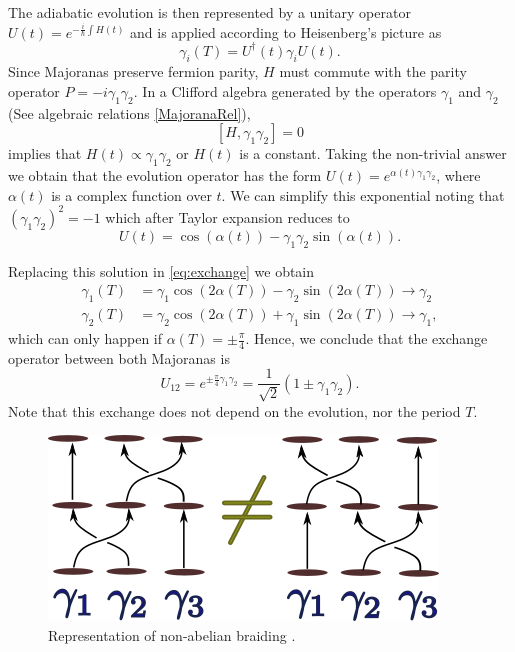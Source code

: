 The adiabatic evolution is then represented by a unitary operator  $ U(t) = e^{-\frac{i}{\hbar}\int H(t)} $ and is applied according to Heisenberg's picture as 
$$\gamma_i(T) = U^\dagger(t)\gamma_iU(t).$$
 \noindent Since Majoranas preserve fermion parity,  $H$ must commute with the parity operator  $P = -i\gamma_{1}\gamma_{2} $. In a Clifford algebra generated by the operators $\gamma_1$ and $\gamma_2$ (See algebraic relations \eqref{MajoranaRel}), $$[H,\gamma_{1}\gamma_{2}]=0$$ implies that $H(t) \propto \gamma_{1}\gamma_{2}$ or $H(t)$ is a constant. Taking the non-trivial answer we obtain that the  evolution operator has the form $  U(t) = e^{\alpha(t) \gamma_1\gamma_2}$, where $\alpha(t)$ is a complex function over $t$. We can simplify this exponential noting that $\left( \gamma_1\gamma_2 \right)^2 =-1$ which after Taylor expansion reduces to
 \begin{equation}
  U(t) = \cos(\alpha(t))-\gamma_1\gamma_2\sin(\alpha(t)).
 \end{equation}

Replacing this solution in \eqref{eq:exchange} we obtain 
\begin{equation}
\begin{aligned}
\gamma_1(T) &= \gamma_1 \cos(2\alpha(T))- \gamma_2 \sin(2\alpha(T)) \rightarrow  \gamma_2\\
\gamma_2(T) &= \gamma_2 \cos(2\alpha(T))+ \gamma_1 \sin(2\alpha(T)) \rightarrow  \gamma_1,
\end{aligned}
\label{eq:nonab}
\end{equation}
which can only happen if $\alpha(T) = \pm\frac{\pi}{4}$. Hence, we conclude that the exchange operator between both Majoranas is 
\begin{equation}
U_{12} = e^{\pm\frac{\pi}{4} \gamma_1\gamma_2}=\frac{1}{\sqrt{2}}\left( 1 \pm \gamma_1 \gamma_2 \right).
\end{equation}
Note that this exchange does not depend on the  evolution, nor  the period $T$. 

\begin{figure}
  \centering
  \includegraphics[scale=1]{IMAGES/Majorana/nonAb.png}
  \caption{\label{fig:Non-ab} Representation of non-abelian braiding .}
\end{figure}


